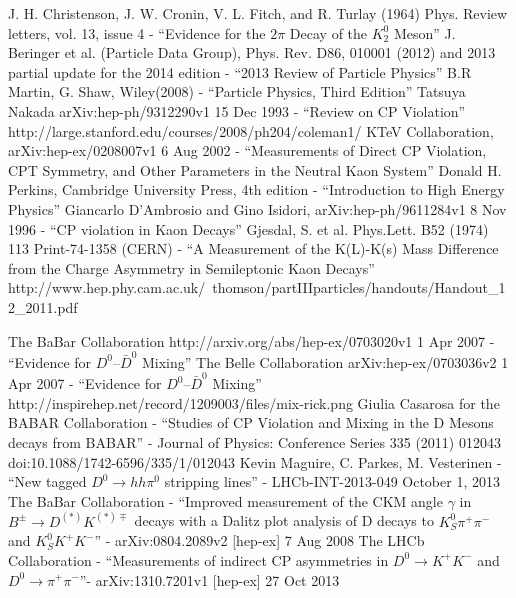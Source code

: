 \documentclass[floatfix,aps,prd,amsmath,amssymb]{revtex4}
\begin{document}
\begin{thebibliography}{10}
J. H. Christenson, J. W. Cronin, V. L. Fitch, and R. Turlay (1964) Phys. Review letters, vol. 13, issue 4 - ``Evidence for the $2 \pi$ Decay of the $K^0_2$ Meson'' 
J. Beringer et al. (Particle Data Group), Phys. Rev. D86, 010001 (2012) and 2013 partial update for the 2014 edition - ``2013 Review of Particle Physics'' 
B.R Martin, G. Shaw, Wiley(2008) - ``Particle Physics, Third Edition'' 
Tatsuya Nakada arXiv:hep-ph/9312290v1 15 Dec 1993 - ``Review on CP Violation''
http://large.stanford.edu/courses/2008/ph204/coleman1/  
KTeV Collaboration, arXiv:hep-ex/0208007v1 6 Aug 2002 - ``Measurements of Direct CP Violation, CPT Symmetry, and Other Parameters in the Neutral Kaon System'' 
Donald H. Perkins, Cambridge University Press, 4th edition - ``Introduction to High Energy Physics'' 
Giancarlo D’Ambrosio and Gino Isidori, arXiv:hep-ph/9611284v1 8 Nov 1996 - ``CP violation in Kaon Decays'' 
Gjesdal, S. et al. Phys.Lett. B52 (1974) 113 Print-74-1358 (CERN) - ``A Measurement of the K(L)-K(s) Mass Difference from the Charge Asymmetry in Semileptonic Kaon Decays'' 
http://www.hep.phy.cam.ac.uk/~thomson/partIIIparticles/handouts/Handout\_12\_2011.pdf

The BaBar Collaboration http://arxiv.org/abs/hep-ex/0703020v1 1 Apr 2007 - ``Evidence for $D^{0}–\bar{D}^{0}$ Mixing''
The Belle Collaboration arXiv:hep-ex/0703036v2 1 Apr 2007 - ``Evidence for $D^{0}–\bar{D}^{0}$ Mixing''
http://inspirehep.net/record/1209003/files/mix-rick.png
Giulia Casarosa for the BABAR Collaboration - ``Studies of CP Violation and Mixing in the D Mesons decays from BABAR'' - Journal of Physics: Conference Series 335 (2011) 012043   doi:10.1088/1742-6596/335/1/012043
Kevin Maguire, C. Parkes, M. Vesterinen - ``New tagged $D^{0} \rightarrow h h \pi^{0}$ stripping lines'' - LHCb-INT-2013-049 October 1, 2013
The BaBar Collaboration - ``Improved measurement of the CKM angle $\gamma$ in $B^{\pm} \rightarrow D^{(*)}K^{(*)\mp}$ decays with a Dalitz plot analysis of D decays to $K^{0}_S \pi^{+} \pi^{-}$ and $K^{0}_{S} K^{+} K^{−}$'' - arXiv:0804.2089v2 [hep-ex] 7 Aug 2008
The LHCb Collaboration - ``Measurements of indirect CP asymmetries in $D^{0} \rightarrow K^{+}K^{-}$ and $D^{0} \rightarrow \pi^{+} \pi^{-}$''- arXiv:1310.7201v1 [hep-ex] 27 Oct 2013



\end{thebibliography}
\end{document}
